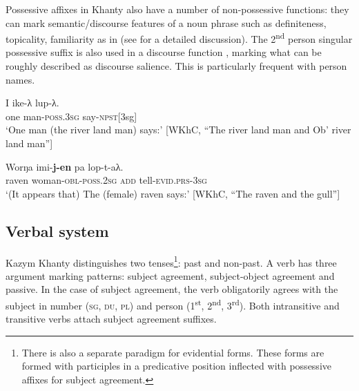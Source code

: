 \documentclass[output=paper]{langscibook}
\begin{document}
Possessive affixes in Khanty also have a number of non-possessive functions: they can mark semantic/discourse features of a noun phrase%
 such as definiteness, topicality, familiarity as in  (see \citealt{Nikolaeva1999Ostyak, Simonenko2017,Mikhailov2018} for a detailed discussion). The 2\textsuperscript{nd} person singular possessive suffix is also used in a discourse function , marking what can be roughly described as discourse salience. This is particularly frequent with person names.
%

\ea 
\label{ex:Volkova:4}
	\ea
	\label{ex:Volkova:4a}
  	 \gll I ike-λ lup-λ.\\
  	 one man\textsc{{}-poss.3sg} say\textsc{{}-npst[}3sg]\\
  	 \glt ‘One man (the river land man) says:’ [WKhC, “The river land man and Ob’ river land man”]

	\ex
	\label{ex:Volkova:4b}
  	 \gll Worŋa imi-\textbf{j-en} pa lop-t-aλ.\\
  	 raven woman\textsc{{}-obl-poss.2sg} \textsc{add} tell\textsc{{}-evid.prs-3sg}\\
  	 \glt ‘(It appears that) The (female) raven says:’ [WKhC, “The raven and the gull”]
	\z
\z

\subsection{{Verbal} {system}}\label{sec:Volkova:2.3}

Kazym Khanty distinguishes two tenses\footnote{There is also a separate paradigm for evidential forms. These forms are formed with participles in a predicative position inflected with possessive affixes for subject agreement.}: past and non-past. A verb has three %
argument marking patterns: subject agreement, subject-object agreement and passive. In the case of subject agreement, the verb obligatorily agrees with the subject in number (\textsc{sg}, \textsc{du}, \textsc{pl}) and person (1\textsuperscript{st}, 2\textsuperscript{nd}, 3\textsuperscript{rd}). Both intransitive  and transitive verbs  attach subject agreement suffixes. 
\end{document}
